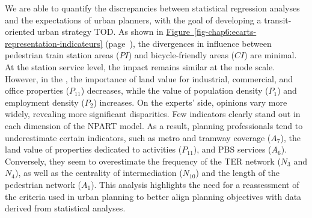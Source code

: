\begin{refsegment}
We are able to quantify the discrepancies between statistical regression analyses and the expectations of urban planners, with the goal of developing a transit-oriented urban strategy \acrshort{TOD}. As shown in \hyperref[fig-chap6:ecarts-representation-indicateurs]{Figure~\ref{fig-chap6:ecarts-representation-indicateurs}} (page~\pageref{fig-chap6:ecarts-representation-indicateurs}), the divergences in influence between pedestrian train station areas (\(PI\)) and bicycle-friendly areas (\(CI\)) are minimal. At the station service level, the impact remains similar at the node scale. However, in the , the importance of land value for industrial, commercial, and office properties (\(P_{11}\)) decreases, while the value of population density (\(P_{1}\)) and employment density (\(P_{2}\)) increases. On the experts' side, opinions vary more widely, revealing more significant disparities. Few indicators clearly stand out in each dimension of the \acrshort{NPART} model. As a result, planning professionals tend to underestimate certain indicators, such as metro and tramway coverage (\(A_{7}\)), the land value of properties dedicated to activities (\(P_{11}\)), and \acrshort{PBS} services (\(A_{6}\)). Conversely, they seem to overestimate the frequency of the \acrshort{TER} network (\(N_{3}\) and \(N_{4}\)), as well as the centrality of intermediation (\(N_{10}\)) and the length of the pedestrian network (\(A_{1}\)). This analysis highlights the need for a reassessment of the criteria used in urban planning to better align planning objectives with data derived from statistical analyses. %


\end{refsegment}
